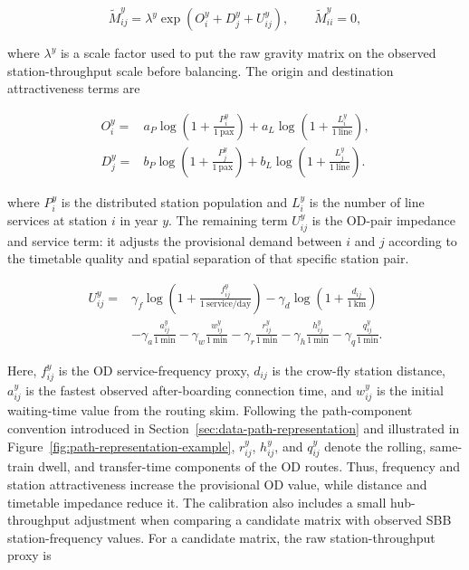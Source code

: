 \documentclass[preprint,12pt]{elsarticle}
\begin{document}
\begin{equation}
\widetilde M^y_{ij}
=
\lambda^y
\exp\left(O_i^y+D_j^y+U_{ij}^y\right),
\qquad
\widetilde M^y_{ii}=0,
\label{eq:part2-gravity-seed}
\end{equation}

where \(\lambda^y\) is a scale factor used to put the raw gravity matrix on the observed station-throughput scale before balancing. The origin and destination attractiveness terms are

\begin{equation}
\begin{aligned}
O_i^y
={}&
a_P\log\left(1+\frac{P_i^y}{1\ \mathrm{pax}}\right)
+
a_L\log\left(1+\frac{L_i^y}{1\ \mathrm{line}}\right),\\
D_j^y
={}&
b_P\log\left(1+\frac{P_j^y}{1\ \mathrm{pax}}\right)
+
b_L\log\left(1+\frac{L_j^y}{1\ \mathrm{line}}\right).
\end{aligned}
\label{eq:part2-origin-destination-terms}
\end{equation}

where \(P_i^y\) is the distributed station population and \(L_i^y\) is the number of line services at station \(i\) in year \(y\). The remaining term \(U_{ij}^y\) is the OD-pair impedance and service term: it adjusts the provisional demand between \(i\) and \(j\) according to the timetable quality and spatial separation of that specific station pair.

\begin{equation}
\begin{aligned}
U_{ij}^y={}&
\gamma_f\log\left(1+\frac{f_{ij}^y}{1\ \mathrm{service/day}}\right)
-\gamma_d\log\left(1+\frac{d_{ij}}{1\ \mathrm{km}}\right)\\
&-\gamma_a\frac{a_{ij}^y}{1\ \mathrm{min}}
-\gamma_w\frac{w_{ij}^y}{1\ \mathrm{min}}
-\gamma_r\frac{r_{ij}^y}{1\ \mathrm{min}}
-\gamma_h\frac{h_{ij}^y}{1\ \mathrm{min}}
-\gamma_q\frac{q_{ij}^y}{1\ \mathrm{min}} .
\end{aligned}
\label{eq:part2-gravity-pair-utility}
\end{equation}

Here, \(f_{ij}^y\) is the OD service-frequency proxy, \(d_{ij}\) is the crow-fly station distance, \(a_{ij}^y\) is the fastest observed after-boarding connection time, and \(w_{ij}^y\) is the initial waiting-time value from the routing skim. Following the path-component convention introduced in Section~\ref{sec:data-path-representation} and illustrated in Figure~\ref{fig:path-representation-example}, \(r_{ij}^y\), \(h_{ij}^y\), and \(q_{ij}^y\) denote the rolling, same-train dwell, and transfer-time components of the OD routes. Thus, frequency and station attractiveness increase the provisional OD value, while distance and timetable impedance reduce it. The calibration also includes a small hub-throughput adjustment when comparing a candidate matrix with observed SBB station-frequency values. For a candidate matrix, the raw station-throughput proxy is
\end{document}
